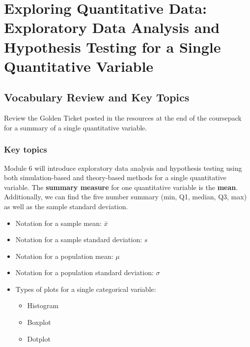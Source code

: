 \documentclass[
]{report}
\begin{document}
\newpage

\newpage

\chapter{Exploring Quantitative Data: Exploratory Data Analysis and Hypothesis Testing for a Single Quantitative Variable}\label{exploring-quantitative-data-exploratory-data-analysis-and-hypothesis-testing-for-a-single-quantitative-variable}

\section{Vocabulary Review and Key Topics}\label{vocabulary-review-and-key-topics-4}

Review the Golden Ticket posted in the resources at the end of the coursepack for a summary of a single quantitative variable.

\subsection{Key topics}\label{key-topics-5}

Module 6 will introduce exploratory data analysis and hypothesis testing using both simulation-based and theory-based methods for a single quantitative variable.
The \textbf{summary measure} for one quantitative variable is the \textbf{mean}.
Additionally, we can find the five number summary (min, Q1, median, Q3, max) as well as the sample standard deviation.

\begin{itemize}
\item
  Notation for a sample mean: \(\bar{x}\)
\item
  Notation for a sample standard deviation: \(s\)
\item
  Notation for a population mean: \(\mu\)
\item
  Notation for a population standard deviation: \(\sigma\)
\item
  Types of plots for a single categorical variable:

  \begin{itemize}
  \item
    Histogram
  \item
    Boxplot
  \item
    Dotplot
  \end{itemize}
\end{itemize}
\end{document}
